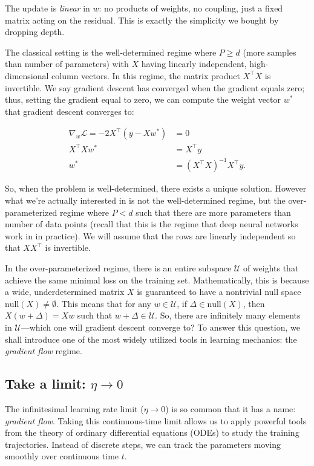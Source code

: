 The update is \textit{linear} in $w$: no products of weights, no coupling, just a fixed matrix acting on the residual. This is exactly the simplicity we bought by dropping depth.

The classical setting is the well-determined regime where $P \geq d$ (more samples than number of parameters) with $X$ having linearly independent, high-dimensional column vectors. In this regime, the matrix product $X^\top X$ is invertible. We say gradient descent has converged when the gradient equals zero; thus, setting the gradient equal to zero, we can compute the weight vector $w^*$ that gradient descent converges to:

\begin{align*}
    \nabla_w \mathcal{L}=-2X^\top(y - Xw^*)&=0 \\
    X^\top X w^* &= X^\top y\\
    w^* &= (X^\top X)^{-1}X^\top y.
\end{align*}

So, when the problem is well-determined, there exists a unique solution. However what we're actually interested in is not the well-determined regime, but the over-parameterized regime where $P<d$ such that there are more parameters than number of data points (recall that this is the regime that deep neural networks work in in practice). We will assume that the rows are linearly independent so that $XX^\top$ is invertible.

In the over-parameterized regime, there is an entire subspace $\mathcal{U}$ of weights that achieve the same minimal loss on the training set. Mathematically, this is because a wide, underdetermined matrix $X$ is guaranteed to have a nontrivial null space $\text{null}(X) \neq \emptyset$. This means that for any $w\in \mathcal{U}$, if $\Delta\in\text{null}(X)$, then $X(w+\Delta)=Xw$ such that $w+\Delta \in \mathcal{U}$. So, there are infinitely many elements in $\mathcal{U}$---which one will gradient descent converge to? To answer this question, we shall introduce one of the most widely utilized tools in learning mechanics: the \textit{gradient flow} regime.

\subsection{Take a limit: $\eta \to 0$}

The infinitesimal learning rate limit ($\eta \to 0$) is so common that it has a name: \textit{gradient flow}. Taking this continuous-time limit allows us to apply powerful tools from the theory of ordinary differential equations (ODEs) to study the training trajectories. Instead of discrete steps, we can track the parameters moving smoothly over continuous time $t$.

